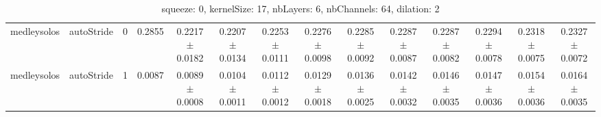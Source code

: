 \begin{table}
\begin{center}
\begin{tabular}{lllccccccccccc}
medleysolos & autoStride & 0 & 0.2855 & 0.2217 $\pm$0.0182 & 0.2207 $\pm$0.0134 & 0.2253 $\pm$0.0111 & 0.2276 $\pm$0.0098 & 0.2285 $\pm$0.0092 & 0.2287 $\pm$0.0087 & 0.2287 $\pm$0.0082 & 0.2294 $\pm$0.0078 & 0.2318 $\pm$0.0075 & 0.2327 $\pm$0.0072 \\ 
medleysolos & autoStride & 1 & 0.0087 & 0.0089 $\pm$0.0008 & 0.0104 $\pm$0.0011 & 0.0112 $\pm$0.0012 & 0.0129 $\pm$0.0018 & 0.0136 $\pm$0.0025 & 0.0142 $\pm$0.0032 & 0.0146 $\pm$0.0035 & 0.0147 $\pm$0.0036 & 0.0154 $\pm$0.0036 & 0.0164 $\pm$0.0035 \\ 
\end{tabular} 
\end{center} 
\caption{squeeze: 0, kernelSize: 17, nbLayers: 6, nbChannels: 64, dilation: 2} 
\label{sq0Kesi17Nbla6Nbch64Di2} 
\end{table} 
 
